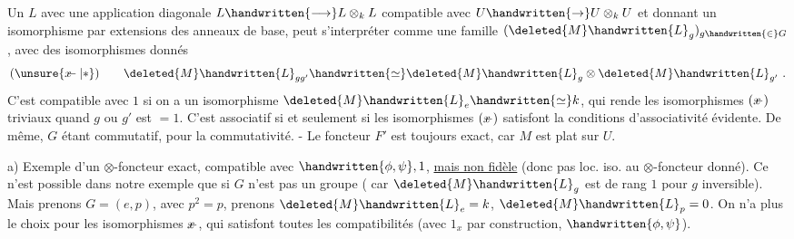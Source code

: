 Un $L$ avec une application diagonale $L\handwritten{\longrightarrow}L\otimes_k L$ compatible avec $U\handwritten{\to}U\otimes_k U$ et donnant un isomorphisme par extensions des anneaux de base, peut s'interpréter comme une famille $(\deleted{M}\handwritten{L}_g)_{g\handwritten{\in}G}$, avec des isomorphismes donnés
\[
(\unsure{\rlap{\(x\)}-|*})\qquad \deleted{M}\handwritten{L}_{gg'}\handwritten{\simeq}\deleted{M}\handwritten{L}_g\otimes\deleted{M}\handwritten{L}_{g'}\ .
\]
C'est compatible avec $1$ si on a un isomorphisme\inserted{\handwritten{\unsure{(*+)|(**)}}} $\deleted{M}\handwritten{L}_e\handwritten{\simeq}k$, qui rende les isomorphismes $(\rlap{\(x\)}-)$ triviaux quand  $g$ ou $g'$ est $=1$. C'est associatif si et seulement si les isomorphismes $(\rlap{\(x\)}-)$ satisfont la  conditions d'associativité évidente. De même, $G$ étant commutatif, pour la commutativité. - Le foncteur $F'$ est toujours exact, car $M$ est plat sur $U$.

a) Exemple d'un $\otimes$-foncteur exact, compatible avec $\handwritten{\phi,\psi},1$, \uline{mais non fidèle} (donc pas loc. iso. au $\otimes$-foncteur donné). Ce n'est possible dans notre exemple que si $G$ n'est pas un groupe ( car $\deleted{M}\handwritten{L}_g$ est de rang $1$ pour $g$ inversible). Mais prenons $G=(e,p)$, avec $p^2=p$, prenons $\deleted{M}\handwritten{L}_e=k$, $\deleted{M}\handwritten{L}_p=0$. On n'a plus le choix pour les isomorphismes $\rlap{\(x\)}-$, qui satisfont toutes les compatibilités (avec $1_x$ par construction, $\handwritten{\phi,\psi}$).

